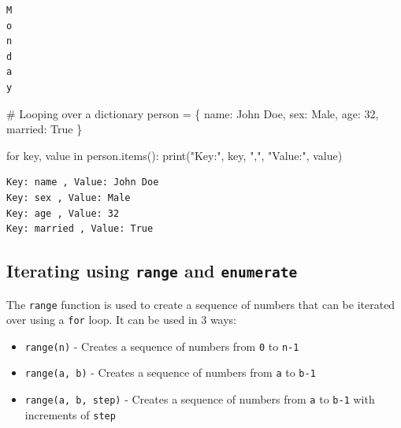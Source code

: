 \documentclass[
  letterpaper,
  DIV=11,
  numbers=noendperiod]{scrreprt}
\newenvironment{Shaded}{\begin{snugshade}}{\end{snugshade}}
\newcommand{\BuiltInTok}[1]{\textcolor[rgb]{0.00,0.23,0.31}{#1}}
\newcommand{\CommentTok}[1]{\textcolor[rgb]{0.37,0.37,0.37}{#1}}
\newcommand{\ControlFlowTok}[1]{\textcolor[rgb]{0.00,0.23,0.31}{#1}}
\newcommand{\DecValTok}[1]{\textcolor[rgb]{0.68,0.00,0.00}{#1}}
\newcommand{\KeywordTok}[1]{\textcolor[rgb]{0.00,0.23,0.31}{#1}}
\newcommand{\NormalTok}[1]{\textcolor[rgb]{0.00,0.23,0.31}{#1}}
\newcommand{\OperatorTok}[1]{\textcolor[rgb]{0.37,0.37,0.37}{#1}}
\newcommand{\StringTok}[1]{\textcolor[rgb]{0.13,0.47,0.30}{#1}}
\newcommand{\VariableTok}[1]{\textcolor[rgb]{0.07,0.07,0.07}{#1}}
\providecommand{\tightlist}{%
  \setlength{\itemsep}{0pt}\setlength{\parskip}{0pt}}\usepackage{longtable,booktabs,array}
\begin{document}
\begin{verbatim}
M
o
n
d
a
y
\end{verbatim}

\begin{Shaded}
\begin{Highlighting}[]
\CommentTok{\# Looping over a dictionary}
\NormalTok{person }\OperatorTok{=}\NormalTok{ \{}
    \StringTok{\textquotesingle{}name\textquotesingle{}}\NormalTok{: }\StringTok{\textquotesingle{}John Doe\textquotesingle{}}\NormalTok{,}
    \StringTok{\textquotesingle{}sex\textquotesingle{}}\NormalTok{: }\StringTok{\textquotesingle{}Male\textquotesingle{}}\NormalTok{,}
    \StringTok{\textquotesingle{}age\textquotesingle{}}\NormalTok{: }\DecValTok{32}\NormalTok{,}
    \StringTok{\textquotesingle{}married\textquotesingle{}}\NormalTok{: }\VariableTok{True}
\NormalTok{\}}

\ControlFlowTok{for}\NormalTok{ key, value }\KeywordTok{in}\NormalTok{ person.items():}
    \BuiltInTok{print}\NormalTok{(}\StringTok{"Key:"}\NormalTok{, key, }\StringTok{","}\NormalTok{, }\StringTok{"Value:"}\NormalTok{, value)}
\end{Highlighting}
\end{Shaded}

\begin{verbatim}
Key: name , Value: John Doe
Key: sex , Value: Male
Key: age , Value: 32
Key: married , Value: True
\end{verbatim}

\hypertarget{iterating-using-range-and-enumerate}{%
\subsection{\texorpdfstring{Iterating using \texttt{range} and
\texttt{enumerate}}{Iterating using range and enumerate}}\label{iterating-using-range-and-enumerate}}

The \texttt{range} function is used to create a sequence of numbers that
can be iterated over using a \texttt{for} loop. It can be used in 3
ways:

\begin{itemize}
\tightlist
\item
  \texttt{range(n)} - Creates a sequence of numbers from \texttt{0} to
  \texttt{n-1}
\item
  \texttt{range(a,\ b)} - Creates a sequence of numbers from \texttt{a}
  to \texttt{b-1}
\item
  \texttt{range(a,\ b,\ step)} - Creates a sequence of numbers from
  \texttt{a} to \texttt{b-1} with increments of \texttt{step}
\end{itemize}
\end{document}
